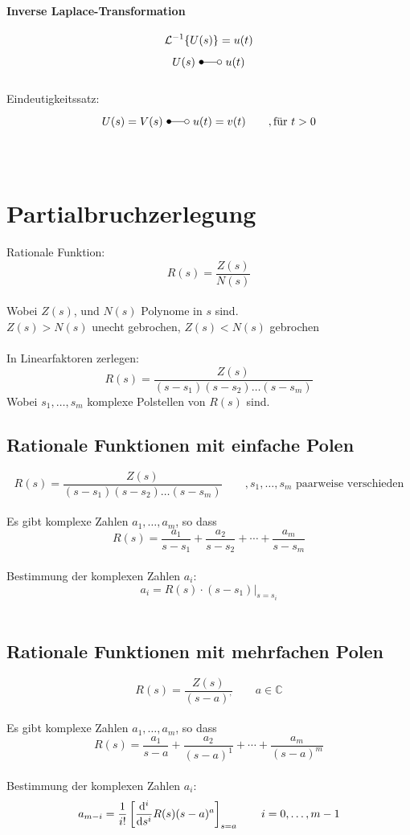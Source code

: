 \paragraph{Inverse Laplace-Transformation}
\[
	\mathcal{L}^{-1}\{U(s)\} = u(t)
\]
\[
	U(s) \ \Laplace \ u(t)
\]
\\Eindeutigkeitssatz:
\[
	U(s) = V(s) \ \Laplace \ u(t) = v(t) \qquad , \text{für }t>0
\]
\\\\

\section{Partialbruchzerlegung}
Rationale Funktion:
\[
	R(s) = \frac{Z(s)}{N(s)}
\]
\\
Wobei $Z(s)$, und $N(s)$ Polynome in $s$ sind. 
\\
$Z(s) > N(s)$ unecht gebrochen, $Z(s) < N(s)$ gebrochen\\
\\
In Linearfaktoren zerlegen:
\[
	R(s) = \frac{Z(s)}{(s-s_1)(s-s_2)\ldots(s-s_m)}
\]
Wobei $s_1,\ldots ,s_m$ komplexe Polstellen von $R(s)$ sind.

\subsection{Rationale Funktionen mit einfache Polen}
\[
	R(s) = \frac{Z(s)}{(s-s_1)(s-s_2)\ldots(s-s_m)} \qquad , s_1,\ldots ,s_m \text{ paarweise verschieden}
\]
\\
Es gibt komplexe Zahlen $a_1,\ldots ,a_m$, so dass
\[
	R(s)=\frac{a_1}{s-s_1}+\frac{a_2}{s-s_2}+\cdots+\frac{a_m}{s-s_m}
\]
\\
Bestimmung der komplexen Zahlen $a_i$:
\[
	a_i=\left.R(s)\cdot(s-s_1)\right|_{s=s_i}
\]
\\

\subsection{Rationale Funktionen mit mehrfachen Polen}
\[
	R(s) = \frac{Z(s)}{(s-a)^,} \qquad a \in \mathbb{C}
\]
\\
Es gibt komplexe Zahlen $a_1,\ldots ,a_m$, so dass
\[
	R(s)=\frac{a_1}{s-a}+\frac{a_2}{(s-a)^1}+\cdots+\frac{a_m}{(s-a)^m}
\]
\\
Bestimmung der komplexen Zahlen $a_i$:
\[
	a_{m-i} = \frac{1}{i!}\left[\frac{\mathrm{d} ^i}{\mathrm{d} s^i}R(s)(s-a)^a\right]_{s=a} \qquad i=0,\ldots,m-1
\]
\\\\

